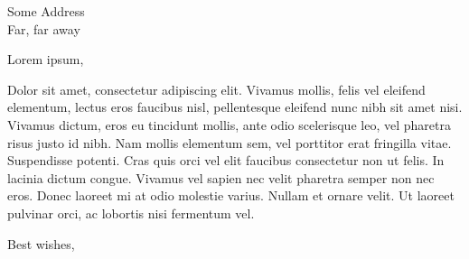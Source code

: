 \documentclass[typewriter]{scrlttr2}
\begin{document}
\raggedright

\begin{letter}{Some Address \\ Far, far away}
  \opening{Lorem ipsum,}

Dolor sit amet, consectetur adipiscing elit. Vivamus mollis, felis vel eleifend elementum, lectus eros faucibus nisl, pellentesque eleifend nunc nibh sit amet nisi. Vivamus dictum, eros eu tincidunt mollis, ante odio scelerisque leo, vel pharetra risus justo id nibh. Nam mollis elementum sem, vel porttitor erat fringilla vitae. Suspendisse potenti. Cras quis orci vel elit faucibus consectetur non ut felis. In lacinia dictum congue. Vivamus vel sapien nec velit pharetra semper non nec eros. Donec laoreet mi at odio molestie varius. Nullam et ornare velit. Ut laoreet pulvinar orci, ac lobortis nisi fermentum vel.


  \closing{Best wishes,}
\end{letter}
\end{document}
